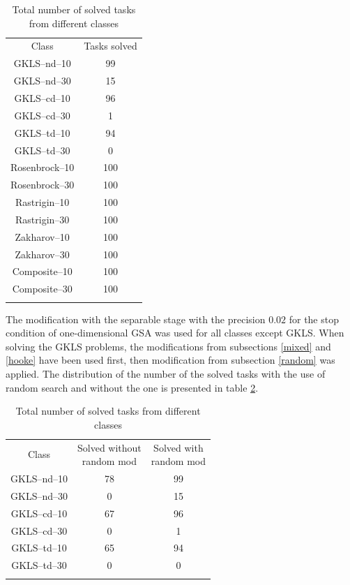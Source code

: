 \documentclass{llncs}
\begin{document}
\begin{table}
	\caption{Total number of solved tasks from different classes}
	\label{tab:solved}
	\center
	\begin{tabular}{cc}
		\hline\noalign{\smallskip}
	Class & Tasks solved   \\
	\noalign{\smallskip} \hline \noalign{\smallskip}		
		GKLS--nd--10 & 99 \\
		GKLS--nd--30 & 15 \\
		GKLS--cd--10 & 96 \\
		GKLS--cd--30 & 1 \\
		GKLS--td--10 & 94 \\
		GKLS--td--30 & 0 \\
		Rosenbrock--10 & 100 \\
		Rosenbrock--30 & 100 \\
		Rastrigin--10 & 100 \\
		Rastrigin--30 & 100 \\
		Zakharov--10 & 100 \\
		Zakharov--30 & 100 \\
		Composite--10 & 100 \\
		Composite--30 & 100 \\
		\noalign{\smallskip}\hline
	\end{tabular}
\end{table}

The modification with the separable stage with the precision $0.02$ for the stop condition of one-dimensional GSA was used for all classes except GKLS. When solving the GKLS problems, the modifications from subsections \ref{mixed} and \ref{hooke} have been used first, then modification from subsection \ref{random} was applied. The distribution of the number of the solved tasks with the use of random search and without the one is presented in table \ref{tab:randsolved}.

\begin{table}
	\caption{Total number of solved tasks from different classes}
	\label{tab:randsolved}
	\center
	\begin{tabular}{ccc}
		\hline\noalign{\smallskip}
	Class &  \parbox[c]{3cm}{ \centering  Solved without\\random mod}   & \parbox[c]{3cm}{ \centering Solved with\\random mod}    \\
	\noalign{\smallskip} \hline \noalign{\smallskip}		
		GKLS--nd--10 & 78 & 99 \\
		GKLS--nd--30 & 0 & 15 \\
		GKLS--cd--10 & 67 & 96 \\
		GKLS--cd--30 & 0 & 1 \\
		GKLS--td--10 & 65 & 94 \\
		GKLS--td--30 & 0 & 0 \\
		\noalign{\smallskip}\hline
	\end{tabular}
\end{table}
\end{document}
